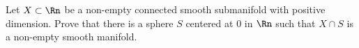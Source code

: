 Let $X\subset \Rn$ be a non-empty connected smooth submanifold with
positive dimension. Prove that there is a sphere $S$ centered at $0$
in $\Rn$ such that $X\cap S$ is a non-empty smooth manifold.
